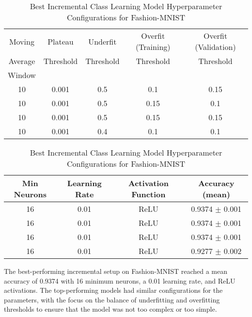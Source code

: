 \documentclass[conference]{IEEEtran}
\begin{document}
\begin{table}[H]
  \centering
  \caption{Best Incremental Class Learning Model Hyperparameter Configurations for Fashion-MNIST}
  \label{tab:icl_fashion_best_configs}
  \scriptsize
  \setlength{\tabcolsep}{6pt}

  \begin{minipage}{\linewidth}
    \centering
    \begin{tabular}{@{}ccccc@{}}
      \toprule
 Moving & Plateau & Underfit & Overfit (Training) & Overfit (Validation) \\
 Average & Threshold & Threshold & Threshold & Threshold \\
 Window & & & & \\
      \midrule
 10 & 0.001 & 0.5 & 0.1 & 0.15 \\
 10 & 0.001 & 0.5 & 0.15 & 0.1 \\
 10 & 0.001 & 0.5 & 0.15 & 0.15 \\
 10 & 0.001 & 0.4 & 0.1 & 0.1 \\
      \bottomrule
    \end{tabular}
  \end{minipage}

  \vspace{6pt}

  \begin{minipage}{\linewidth}
    \centering
    \begin{tabular}{@{}cccc@{}}
      \toprule
 Min Neurons & Learning Rate & Activation Function & Accuracy (mean) \\
      \midrule
 16 & 0.01 & ReLU & 0.9374 $\pm$ 0.001\\
 16 & 0.01 & ReLU & 0.9374 $\pm$ 0.001\\
 16 & 0.01 & ReLU & 0.9374 $\pm$ 0.001\\
 16 & 0.01 & ReLU & 0.9277 $\pm$ 0.002\\
      \bottomrule
    \end{tabular}
  \end{minipage}
\end{table}
The best-performing incremental setup on Fashion-MNIST reached a mean accuracy of 0.9374 with 16 minimum neurons, 
a 0.01 learning rate, and ReLU activations. The top-performing models had similar configurations for the 
parameters, with the focus on the balance of underfitting and overfitting thresholds to ensure that the model was not 
too complex or too simple.
\end{document}

